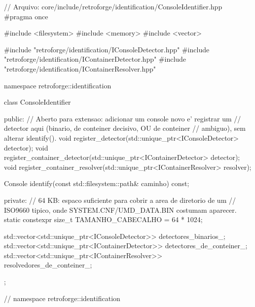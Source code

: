 \begin{CaixaCodigo}
// Arquivo: core/include/retroforge/identification/ConsoleIdentifier.hpp
#pragma once

#include <filesystem>
#include <memory>
#include <vector>

#include "retroforge/identification/IConsoleDetector.hpp"
#include "retroforge/identification/IContainerDetector.hpp"
#include "retroforge/identification/IContainerResolver.hpp"

namespace retroforge::identification {

class ConsoleIdentifier {
public:
    // Aberto para extensao: adicionar um console novo e' registrar um
    // detector aqui (binario, de conteiner decisivo, OU de conteiner
    // ambiguo), sem alterar identify().
    void register_detector(std::unique_ptr<IConsoleDetector> detector);
    void register_container_detector(std::unique_ptr<IContainerDetector> detector);
    void register_container_resolver(std::unique_ptr<IContainerResolver> resolver);

    Console identify(const std::filesystem::path& caminho) const;

private:
    // 64 KB: espaco suficiente para cobrir a area de diretorio de um
    // ISO9660 tipico, onde SYSTEM.CNF/UMD_DATA.BIN costumam aparecer.
    static constexpr size_t TAMANHO_CABECALHO = 64 * 1024;

    std::vector<std::unique_ptr<IConsoleDetector>> detectores_binarios_;
    std::vector<std::unique_ptr<IContainerDetector>> detectores_de_conteiner_;
    std::vector<std::unique_ptr<IContainerResolver>> resolvedores_de_conteiner_;
};

} // namespace retroforge::identification
\end{CaixaCodigo}

